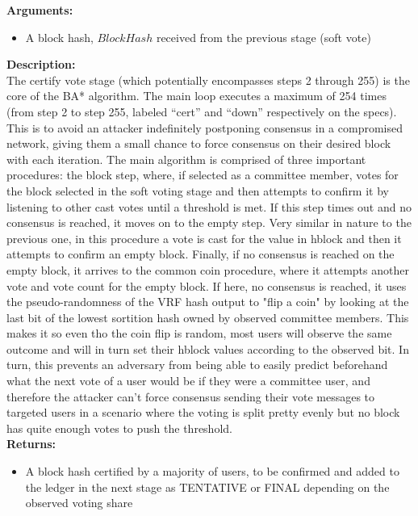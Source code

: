 \documentclass[10pt,a4paper]{article}
\begin{document}
\noindent \textbf{Arguments:}
\begin{itemize}
    \item A block hash, $BlockHash$ received from the previous stage (soft vote)
  \end{itemize}

\noindent \textbf{Description:}\\
The certify vote stage (which potentially encompasses steps 2 through 255) is the core of the BA* algorithm.
The main loop executes a maximum of 254 times (from step 2 to step 255, labeled ``cert'' and ``down'' respectively on the specs).
This is to avoid an attacker indefinitely postponing consensus in a compromised network, giving them a small chance to force consensus on their desired block with each iteration.
The main algorithm is comprised of three important procedures: the block step, where, if selected as a committee member, votes for the block selected in the soft voting stage and then attempts to confirm it by listening to other cast votes until a threshold is met.
If this step times out and no consensus is reached, it moves on to the empty step. Very similar in nature to the previous one, in this procedure a vote is cast for the value in hblock and then it attempts to confirm an empty block.
Finally, if no consensus is reached on the empty block, it arrives to the common coin procedure, where it attempts another vote and vote count for the empty block. If here, no consensus is reached, it uses the pseudo-randomness of the VRF hash output to "flip a coin" by looking at the last bit of the lowest sortition hash owned by observed committee members.
This makes it so even tho the coin flip is random, most users will observe the same outcome and will in turn set their hblock values according to the observed bit. In turn, this prevents an adversary from being able to easily predict beforehand what the next vote of a user would be if they were a committee user, and therefore the attacker can't force consensus 
sending their vote messages to targeted users in a scenario where the voting is split pretty evenly but no block has quite enough votes to push the threshold.\\

\noindent \textbf{Returns:}
\begin{itemize}
    \item A block hash certified by a majority of users, to be confirmed and added to the ledger in the next stage as TENTATIVE or FINAL depending
    on the observed voting share
  \end{itemize}
\end{document}
